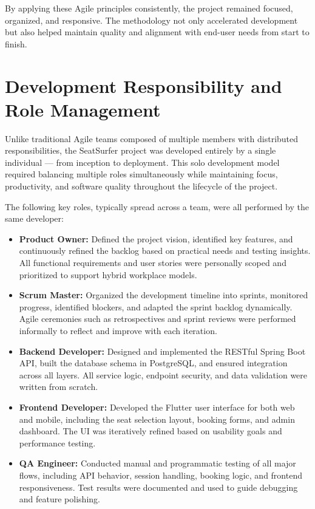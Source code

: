 \documentclass[12pt,a4paper]{report}
\begin{document}
By applying these Agile principles consistently, the project remained focused, organized, and responsive. The methodology not only accelerated development but also helped maintain quality and alignment with end-user needs from start to finish.

\section{Development Responsibility and Role Management}

Unlike traditional Agile teams composed of multiple members with distributed responsibilities, the SeatSurfer project was developed entirely by a single individual — from inception to deployment. This solo development model required balancing multiple roles simultaneously while maintaining focus, productivity, and software quality throughout the lifecycle of the project.

The following key roles, typically spread across a team, were all performed by the same developer:

\begin{itemize}
\item \textbf{Product Owner:}
Defined the project vision, identified key features, and continuously refined the backlog based on practical needs and testing insights. All functional requirements and user stories were personally scoped and prioritized to support hybrid workplace models.
\item \textbf{Scrum Master:}  
Organized the development timeline into sprints, monitored progress, identified blockers, and adapted the sprint backlog dynamically. Agile ceremonies such as retrospectives and sprint reviews were performed informally to reflect and improve with each iteration.

\item \textbf{Backend Developer:}  
Designed and implemented the RESTful Spring Boot API, built the database schema in PostgreSQL, and ensured integration across all layers. All service logic, endpoint security, and data validation were written from scratch.

\item \textbf{Frontend Developer:}  
Developed the Flutter user interface for both web and mobile, including the seat selection layout, booking forms, and admin dashboard. The UI was iteratively refined based on usability goals and performance testing.

\item \textbf{QA Engineer:}  
Conducted manual and programmatic testing of all major flows, including API behavior, session handling, booking logic, and frontend responsiveness. Test results were documented and used to guide debugging and feature polishing.
\end{itemize}
\end{document}
